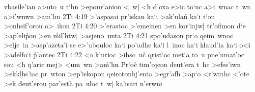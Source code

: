 vbasile'ian
a>uto~u
t`hn
>epour'anion
<~w|
<h
d'oxa
e>ic
to`uc
a>i~wnac
t~wn
a>i'wnwn
>am'hn\bibvsend
\vs 2Ti 4:19
>'aspasai
pr'iskan
ka`i
>ak'ula\r{n}
ka`i
t`on
>onhsif'orou
o>~ikon\bibvsend
\vs 2Ti 4:20
>'erastoc
>'emeinen
>en
kor'injw|
tr'ofimon
d`e
>ap'eli\r{p}on
>en
\r{m}il'htw|
>asjeno~unta\bibvsend
\vs 2Ti 4:21
spo'udason
pr`o
qeim~wnoc
>elje~in
>asp'azeta'i
se
e>'ubouloc
ka`i
po'udhc
ka`i
l~inoc
ka`i
klaud'ia
ka`i
o<i
>adelfo`i
\r{p}'antec\bibvsend
{}
\vs 2Ti 4:22
<o
k'urioc
>ihso~uc\r{}
qrist`oc
met`a
to~u
pne'umat'oc
sou
<h
q'aric
mej>
<um~wn
>a\r{m}'hn\bibvsend
{}
Pr`oc\r{}
tim'ojeon
deut'era
t~hc
>efes'iwn
>ekklhs'iac
pr~wton
>ep'iskopon
qeirotonhj'enta
>egr'afh
>ap`o
<r'wmhc
<'ote
>ek
deut'erou
par'esth
pa~uloc
t~w|
ka'isari
n'erwni\bibvsend
